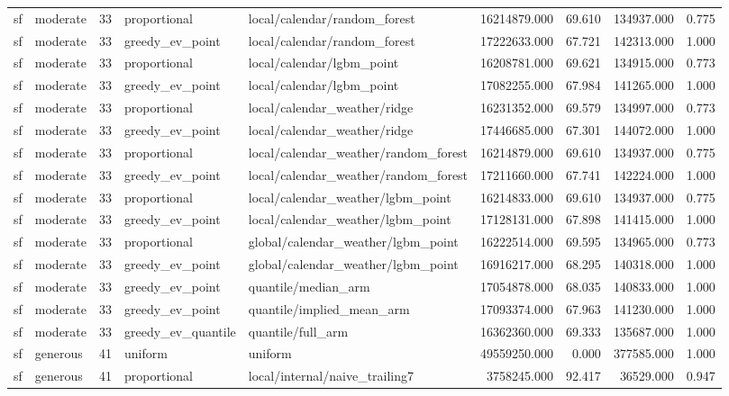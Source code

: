 \begin{tabular}{llrllrrrr}
sf & moderate & 33 & proportional & local/calendar/random\_forest & 16214879.000 & 69.610 & 134937.000 & 0.775 \\
sf & moderate & 33 & greedy\_ev\_point & local/calendar/random\_forest & 17222633.000 & 67.721 & 142313.000 & 1.000 \\
sf & moderate & 33 & proportional & local/calendar/lgbm\_point & 16208781.000 & 69.621 & 134915.000 & 0.773 \\
sf & moderate & 33 & greedy\_ev\_point & local/calendar/lgbm\_point & 17082255.000 & 67.984 & 141265.000 & 1.000 \\
sf & moderate & 33 & proportional & local/calendar\_weather/ridge & 16231352.000 & 69.579 & 134997.000 & 0.773 \\
sf & moderate & 33 & greedy\_ev\_point & local/calendar\_weather/ridge & 17446685.000 & 67.301 & 144072.000 & 1.000 \\
sf & moderate & 33 & proportional & local/calendar\_weather/random\_forest & 16214879.000 & 69.610 & 134937.000 & 0.775 \\
sf & moderate & 33 & greedy\_ev\_point & local/calendar\_weather/random\_forest & 17211660.000 & 67.741 & 142224.000 & 1.000 \\
sf & moderate & 33 & proportional & local/calendar\_weather/lgbm\_point & 16214833.000 & 69.610 & 134937.000 & 0.775 \\
sf & moderate & 33 & greedy\_ev\_point & local/calendar\_weather/lgbm\_point & 17128131.000 & 67.898 & 141415.000 & 1.000 \\
sf & moderate & 33 & proportional & global/calendar\_weather/lgbm\_point & 16222514.000 & 69.595 & 134965.000 & 0.773 \\
sf & moderate & 33 & greedy\_ev\_point & global/calendar\_weather/lgbm\_point & 16916217.000 & 68.295 & 140318.000 & 1.000 \\
sf & moderate & 33 & greedy\_ev\_point & quantile/median\_arm & 17054878.000 & 68.035 & 140833.000 & 1.000 \\
sf & moderate & 33 & greedy\_ev\_point & quantile/implied\_mean\_arm & 17093374.000 & 67.963 & 141230.000 & 1.000 \\
sf & moderate & 33 & greedy\_ev\_quantile & quantile/full\_arm & 16362360.000 & 69.333 & 135687.000 & 1.000 \\
sf & generous & 41 & uniform & uniform & 49559250.000 & 0.000 & 377585.000 & 1.000 \\
sf & generous & 41 & proportional & local/internal/naive\_trailing7 & 3758245.000 & 92.417 & 36529.000 & 0.947 \\

\end{tabular}

